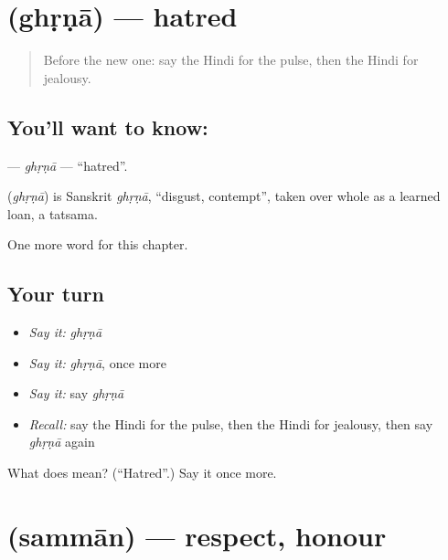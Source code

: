 \section[\texorpdfstring{\hi{घृणा} (ghṛṇā)}{घृणा (ghṛṇā)}]{ (ghṛṇā) — hatred}

\label{lesson:HI-C257-ghrna}



\begin{quote}
Before the new one: say the Hindi for the pulse, then the Hindi for jealousy.
\end{quote}

\subsection*{You'll want to know: }
\textbf{} — \emph{ghṛṇā} — \textquotedblleft{}hatred\textquotedblright{}.

\begin{cousinweb}
\textbf{} (\emph{ghṛṇā}) is Sanskrit \emph{ghṛṇā}, \textquotedblleft{}disgust, contempt\textquotedblright{}, taken over whole as a learned loan, a tatsama.
\end{cousinweb}

\begin{grammarlens}[title={What you've built}]
One more word for this chapter.
\end{grammarlens}

\subsection*{Your turn}
\begin{itemize}
\raggedright
  \item \emph{Say it:} \emph{ghṛṇā}
  \item \emph{Say it:} \emph{ghṛṇā}, once more
  \item \emph{Say it:} say \emph{ghṛṇā}
  \item \emph{Recall:} say the Hindi for the pulse, then the Hindi for jealousy, then say \emph{ghṛṇā} again
\end{itemize}

\begin{tcolorbox}[breakable,colback=teal!4,colframe=teal!35!black,title={Before you move on}]
What does  mean? (\textquotedblleft{}Hatred\textquotedblright{}.) Say it once more.
\end{tcolorbox}
\section[\texorpdfstring{\hi{सम्मान} (sammān)}{सम्मान (sammān)}]{ (sammān) — respect, honour}

